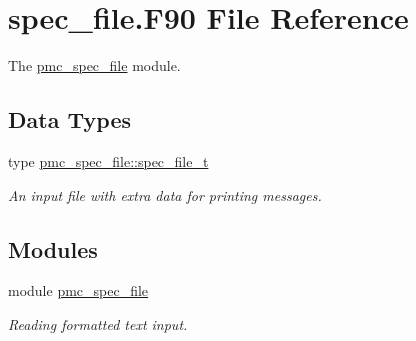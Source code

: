 \hypertarget{spec__file_8_f90}{}\section{spec\+\_\+file.\+F90 File Reference}
\label{spec__file_8_f90}


The \mbox{\hyperlink{namespacepmc__spec__file}{pmc\+\_\+spec\+\_\+file}} module.  


\subsection*{Data Types}
\begin{DoxyCompactItemize}
\item 
type \mbox{\hyperlink{structpmc__spec__file_1_1spec__file__t}{pmc\+\_\+spec\+\_\+file\+::spec\+\_\+file\+\_\+t}}
\begin{DoxyCompactList}\small\item\em An input file with extra data for printing messages. \end{DoxyCompactList}\end{DoxyCompactItemize}
\subsection*{Modules}
\begin{DoxyCompactItemize}
\item 
module \mbox{\hyperlink{namespacepmc__spec__file}{pmc\+\_\+spec\+\_\+file}}
\begin{DoxyCompactList}\small\item\em Reading formatted text input. \end{DoxyCompactList}\end{DoxyCompactItemize}
